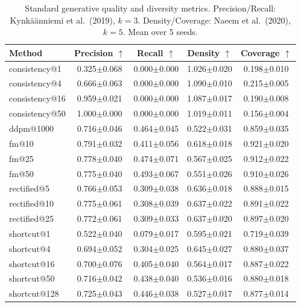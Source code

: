 \begin{table}[t]
\centering
\caption{Standard generative quality and diversity metrics. Precision/Recall: Kynk\"a\"anniemi et al.\ (2019), $k{=}3$. Density/Coverage: Naeem et al.\ (2020), $k{=}5$. Mean over 5 seeds.}
\label{tab:precision_recall}
\footnotesize
\begin{tabular}{lcccc}
\toprule
Method & Precision $\uparrow$ & Recall $\uparrow$ & Density $\uparrow$ & Coverage $\uparrow$ \\
\midrule
  consistency@1 & 0.325$\pm$0.068 & 0.000$\pm$0.000 & 1.026$\pm$0.020 & 0.198$\pm$0.010 \\
  consistency@4 & 0.666$\pm$0.063 & 0.000$\pm$0.000 & 1.090$\pm$0.010 & 0.215$\pm$0.005 \\
  consistency@16 & 0.959$\pm$0.021 & 0.000$\pm$0.000 & 1.087$\pm$0.017 & 0.190$\pm$0.008 \\
  consistency@50 & 1.000$\pm$0.000 & 0.000$\pm$0.000 & 1.019$\pm$0.011 & 0.156$\pm$0.004 \\
  ddpm@1000 & 0.716$\pm$0.046 & 0.464$\pm$0.045 & 0.522$\pm$0.031 & 0.859$\pm$0.035 \\
  fm@10 & 0.791$\pm$0.032 & 0.411$\pm$0.056 & 0.618$\pm$0.018 & 0.921$\pm$0.020 \\
  fm@25 & 0.778$\pm$0.040 & 0.474$\pm$0.071 & 0.567$\pm$0.025 & 0.912$\pm$0.022 \\
  fm@50 & 0.775$\pm$0.040 & 0.493$\pm$0.067 & 0.551$\pm$0.026 & 0.910$\pm$0.026 \\
  rectified@5 & 0.766$\pm$0.053 & 0.309$\pm$0.038 & 0.636$\pm$0.018 & 0.888$\pm$0.015 \\
  rectified@10 & 0.775$\pm$0.061 & 0.308$\pm$0.039 & 0.637$\pm$0.022 & 0.891$\pm$0.022 \\
  rectified@25 & 0.772$\pm$0.061 & 0.309$\pm$0.033 & 0.637$\pm$0.020 & 0.897$\pm$0.020 \\
  shortcut@1 & 0.522$\pm$0.040 & 0.079$\pm$0.017 & 0.595$\pm$0.021 & 0.719$\pm$0.039 \\
  shortcut@4 & 0.694$\pm$0.052 & 0.304$\pm$0.025 & 0.645$\pm$0.027 & 0.880$\pm$0.037 \\
  shortcut@16 & 0.700$\pm$0.076 & 0.405$\pm$0.040 & 0.564$\pm$0.017 & 0.887$\pm$0.022 \\
  shortcut@50 & 0.716$\pm$0.042 & 0.438$\pm$0.040 & 0.536$\pm$0.016 & 0.880$\pm$0.018 \\
  shortcut@128 & 0.725$\pm$0.043 & 0.446$\pm$0.038 & 0.527$\pm$0.017 & 0.877$\pm$0.014 \\
\bottomrule
\end{tabular}
\end{table}
